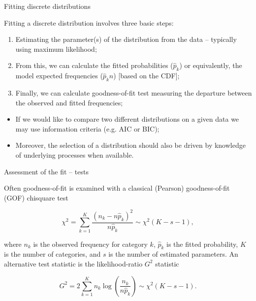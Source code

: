 \documentclass[10pt,ignorenonframetext,aspectratio=169]{beamer}
\begin{document}
\begin{frame}{Fitting discrete distributions}

Fitting a discrete distribution involves three basic steps:

    \begin{enumerate}
    \justifying
        \item Estimating the parameter(s) of the distribution from the data -- typically using maximum likelihood;
        \item From this, we can calculate the fitted probabilities ($\hat{p}_k$) or equivalently, the model expected frequencies ($\hat{p}_k n$) [based on the CDF];
        \item Finally, we can calculate goodness-of-fit test measuring the departure between the observed and fitted frequencies;
    \end{enumerate}

 \begin{itemize}
    \item If we would like to compare two different distributions on a given data we may use information criteria (e.g. AIC or BIC);
    \item Moreover, the selection of a distribution should also be driven by knowledge of underlying processes when available.
 \end{itemize}
\end{frame}

\begin{frame}{Assessment of the fit -- tests}

Often goodness-of-fit is examined with a classical (Pearson) goodness-of-fit (GOF) chisquare test
    
    \begin{equation}
        \chi^2 = \sum_{k=1}^{K} \frac{\left(n_{k}-n \hat{p}_{k}\right)^{2}}{n \hat{p}_{k}} \sim \chi^{2}(K-s-1),
    \end{equation}
    
    where $n_k$ is the observed frequency for category $k$, $\hat{p}_k$ is the fitted probability, $K$ is the number of categories, and $s$ is the number of estimated parameters. An alternative test statistic is the likelihood-ratio $G^2$ statistic
    
    \begin{equation}
        G^{2}=2\sum_{k=1}^{K} n_{k} \log \left(\frac{n_{k}}{n \hat{p}_{k}}\right) \sim \chi^2(K-s-1).
    \end{equation}
\end{frame}
\end{document}
